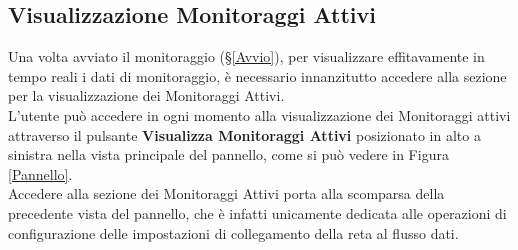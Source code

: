 \subsection{Visualizzazione Monitoraggi Attivi}\label{MonitoraggiAttivi}

Una volta avviato il monitoraggio (§\ref{Avvio}), per visualizzare effitavamente in tempo reali i dati di monitoraggio, è necessario innanzitutto accedere alla sezione per la visualizzazione dei Monitoraggi Attivi.\\
L'utente può accedere in ogni momento alla visualizzazione dei Monitoraggi attivi attraverso il pulsante \textbf{Visualizza Monitoraggi Attivi} posizionato in alto a sinistra nella vista principale del pannello, come si può vedere in Figura \ref{Pannello}.\\

Accedere alla sezione dei Monitoraggi Attivi porta alla scomparsa della precedente vista del pannello, che è infatti unicamente dedicata alle operazioni di configurazione delle impostazioni di collegamento della reta al flusso dati.
